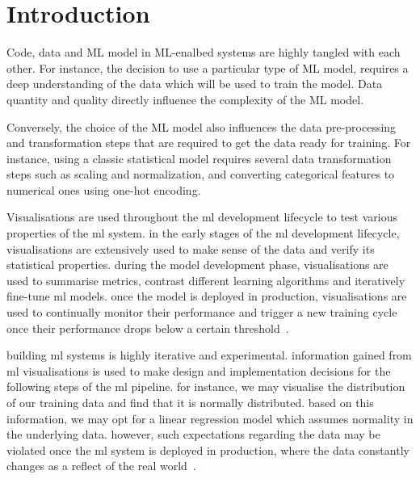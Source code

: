 \section{Introduction}





Code, data and ML model in ML-enalbed systems are highly tangled with each other. For instance, the decision to use a particular type of ML model, requires a deep understanding of the data which will be used to train the model. Data quantity and quality directly influence the complexity of the ML model. 

Conversely, the choice of the ML model also influences the data pre-processing and transformation steps that are required to get the data ready for training. For instance, using a classic statistical model requires several data transformation steps such as scaling and normalization, and converting categorical features to numerical ones using one-hot encoding.

Visualisations are used throughout the ml development lifecycle to test various properties of the ml system. in the early stages of the ml development lifecycle, visualisations are extensively used to make sense of the data and verify its statistical properties. during the model development phase, visualisations are used to summarise metrics, contrast different learning algorithms and iteratively fine-tune ml models. once the model is deployed in production, visualisations are used to continually monitor their performance and trigger a new training cycle once their performance drops below a certain threshold~\cite{yuan2021survey,hohman2019visual,amershi2015modeltracker,wexler2020if}.

building ml systems is highly iterative and experimental. information gained from ml visualisations is used to make design and implementation decisions for the following steps of the ml pipeline. for instance, we may visualise the distribution of our training data and find that it is normally distributed. based on this information, we may opt for a linear regression model which assumes normality in the underlying data. however, such expectations regarding the data may be violated once the ml system is deployed in production, where the data constantly changes as a reflect of the real world~\cite{amershi2019software,sambasivan2021everyone,breck2019data,baylor2017tfx}.

